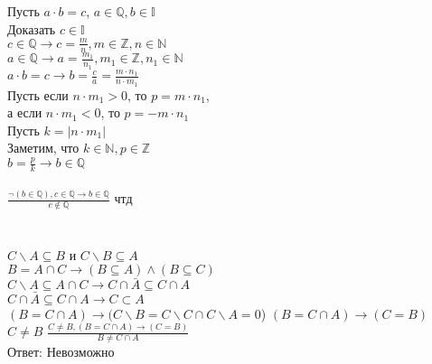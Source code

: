 \documentclass{article}
\begin{document}
\section{}
Пусть $a \cdot b = c$, $a \in \mathbb{Q}, b \in \mathbb{I}$\\
Доказать $c \in \mathbb{I}$\\
$c \in \mathbb{Q} \rightarrow c = \frac{m}{n}, m \in \mathbb{Z}, n \in \mathbb{N}$\\
$a \in \mathbb{Q} \rightarrow a = \frac{m_1}{n_1}, m_1 \in \mathbb{Z}, n_1 \in \mathbb{N}$\\
$a \cdot b = c \rightarrow b = \frac{c}{a} = \frac{m \cdot n_1}{n \cdot m_1}$\\
Пусть если $n \cdot m_1 > 0$, то $p = m \cdot n_1$,\\ а если $n \cdot m_1 < 0$, то $p = -m \cdot n_1$\\
Пусть $k = |n \cdot m_1|$\\
Заметим, что $k \in \mathbb{N}, p \in \mathbb{Z}$\\
$b = \frac{p}{k} \rightarrow b \in \mathbb{Q}$\\\\
$\frac{\neg(b \in \mathbb{Q}), c \in \mathbb{Q} \rightarrow b \in \mathbb{Q}}{c \notin \mathbb{Q}}$ чтд
\section{}
$C \backslash A \subseteq B$ и $C \backslash B \subseteq A$\\
$B = A \cap C \rightarrow (B \subseteq A) \wedge (B \subseteq C)$\\
$C \backslash A \subseteq A \cap C \rightarrow C \cap \bar A \subseteq C \cap A$\\
$C \cap \bar A \subseteq C \cap A \rightarrow C \subset A$\\
$(B = C \cap A) \rightarrow (C \backslash B = C \backslash C \cap C \backslash A = 0$)
$(B = C \cap A) \rightarrow (C = B)$
$C \neq B$
$\frac{C \neq B, (B = C \cap A) \rightarrow (C = B)}{B \neq C \cap A}$
\\Ответ: Невозможно
\end{document}
